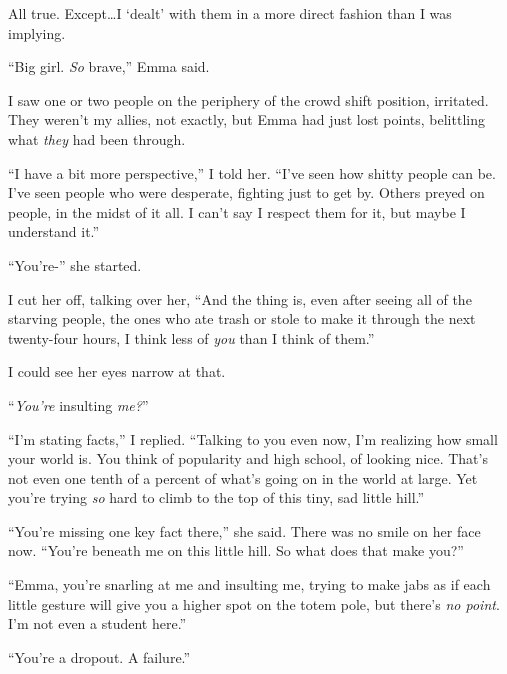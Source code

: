 All true.  Except\ldots I `dealt' with them in a more direct fashion than I was implying.



``Big girl.  \emph{So} brave,'' Emma said.



I saw one or two people on the periphery of the crowd shift position, irritated.  They weren't my allies, not exactly, but Emma had just lost points, belittling what \emph{they} had been through.



``I have a bit more perspective,'' I told her.  ``I've seen how shitty people can be.  I've seen people who were desperate, fighting just to get by.  Others preyed on people, in the midst of it all.  I can't say I respect them for it, but maybe I understand it.''



``You're-'' she started.



I cut her off, talking over her, ``And the thing is, even after seeing all of the starving people, the ones who ate trash or stole to make it through the next twenty-four hours, I think less of \emph{you} than I think of them.''



I could see her eyes narrow at that.



``\emph{You're }insulting\emph{ me?}''



``I'm stating facts,'' I replied.  ``Talking to you even now, I'm realizing how small your world is.  You think of popularity and high school, of looking nice.  That's not even one tenth of a percent of what's going on in the world at large.  Yet you're trying \emph{so} hard to climb to the top of this tiny, sad little hill.''



``You're missing one key fact there,'' she said.  There was no smile on her face now.  ``You're beneath me on this little hill.  So what does that make you?''



``Emma, you're snarling at me and insulting me, trying to make jabs as if each little gesture will give you a higher spot on the totem pole, but there's \emph{no point}.  I'm not even a student here.''



``You're a dropout.  A failure.''



